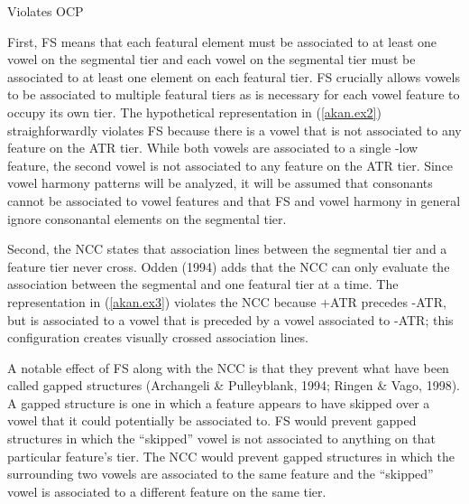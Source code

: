 \documentclass[,doc,floatsintext]{apa6}
\theoremstyle{definition}
\theoremstyle{definition}
\theoremstyle{definition}
\theoremstyle{remark}
\begin{document}
\begin{exe}
\ex \label{akan.ex4} Violates OCP
\end{exe}

First, FS means that each featural element must be associated to at
least one vowel on the segmental tier and each vowel on the segmental
tier must be associated to at least one element on each featural tier.
FS crucially allows vowels to be associated to multiple featural tiers
as is necessary for each vowel feature to occupy its own tier. The
hypothetical representation in (\ref{akan.ex2}) straighforwardly
violates FS because there is a vowel that is not associated to any
feature on the ATR tier. While both vowels are associated to a single
-low feature, the second vowel is not associated to any feature on the
ATR tier. Since vowel harmony patterns will be analyzed, it will be
assumed that consonants cannot be associated to vowel features and that
FS and vowel harmony in general ignore consonantal elements on the
segmental tier.

Second, the NCC states that association lines between the segmental tier
and a feature tier never cross. Odden (1994) adds that the NCC can only
evaluate the association between the segmental and one featural tier at
a time. The representation in (\ref{akan.ex3}) violates the NCC because
+ATR precedes -ATR, but is associated to a vowel that is preceded by a
vowel associated to -ATR; this configuration creates visually crossed
association lines.

A notable effect of FS along with the NCC is that they prevent what have
been called gapped structures (Archangeli \& Pulleyblank, 1994; Ringen
\& Vago, 1998). A gapped structure is one in which a feature appears to
have skipped over a vowel that it could potentially be associated to. FS
would prevent gapped structures in which the \enquote{skipped} vowel is
not associated to anything on that particular feature's tier. The NCC
would prevent gapped structures in which the surrounding two vowels are
associated to the same feature and the \enquote{skipped} vowel is
associated to a different feature on the same tier.
\end{document}

